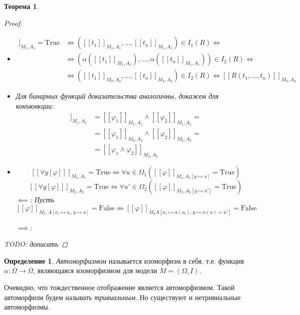 \documentclass[12pt]{article}
\theoremstyle{definition}
\newtheorem{definition}{Определение}[section]
\theoremstyle{plain}
\newtheorem{theorem}{Теорема}[section]
\theoremstyle{remark}
\begin{document}
\begin{theorem}
\begin{proof}
\begin{enumerate}
\begin{itemize}
          \item
            \begin{align*}
              [[R(t_1, \dots, t_n)]]_{M_1,A_1} = \mathrm{True} &\iff
              ([[t_1]]_{M_1,A_1}, \dots, [[t_n]]_{M_1,A_1}) \in
              I_1(R) \iff\\&\iff
              (\alpha([[t_1]]_{M_1,A_1}), \dots,
              \alpha([[t_n]]_{M_1,A_1})) \in I_2(R) \iff\\&\iff
              ([[t_1]]_{M_2,A_2}, \dots, [[t_n]]_{M_2,A_2}) \in
              I_2(R) \iff [[R(t_1, \dots, t_n)]]_{M_2,A_2}
            \end{align*}

          \item Для бинарных функций доказательства аналогичны,
            докажем для конъюнкции:
            \begin{align*}
              [[\varphi_1 \land \varphi_2]]_{M_1,A_1} &=
              [[\varphi_1]]_{M_1,A_1} \land [[\varphi_2]]_{M_1,A_1} =\\&=
              [[\varphi_1]]_{M_2,A_2} \land [[\varphi_2]]_{M_2,A_2} =\\&=
              [[\varphi_1 \land \varphi_2]]_{M_2,A_2}
            \end{align*}

          \item
            \[
              [[\forall y [\varphi]]]_{M_1,A_1} = \mathrm{True} \iff
              \forall u \in \Omega_1 ([[\varphi]]_{M_1,A_1[y \mapsto
              u]} = \mathrm{True})
            \]
            \[
              [[\forall y [\varphi]]]_{M_2,A_2} = \mathrm{True} \iff
              \forall u' \in \Omega_2 ([[\varphi]]_{M_2,A_2[y \mapsto
              u']} = \mathrm{True})
            \]
            $\impliedby$: Пусть $[[\varphi]]_{M_1,A[x_i \mapsto u_i,
            y \mapsto u]} = \mathrm{False} \iff [[\varphi]]_{M_2A[x_i
            \mapsto \alpha(u_i), y \mapsto \alpha(u) = u']} = \mathrm{False}$

            $\implies$:
        \end{itemize}
    \end{enumerate}
    TODO: дописать
  \end{proof}
\end{theorem}

\begin{definition}
  \textit{Автоморфизмом} называется изоморфизм в себя, т.е. функция
  $\alpha \colon \Omega \to \Omega$, являющаяся изоморфизмом для
  модели $M = (\Omega, I)$.

  Очевидно, что тождественное отображение является автоморфизмом.
  Такой автоморфизм будем называть \textit{тривиальным}. Но
  существуют и нетривиальные автоморфизмы.
\end{definition}
\end{document}
